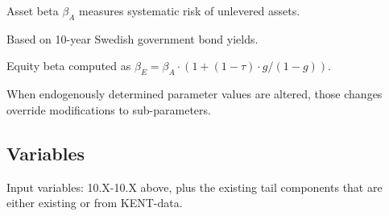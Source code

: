 \begin{table}[H]
\begin{threeparttable}
\begin{tablenotes}
\item[b] Asset beta $\beta_A$ measures systematic risk of unlevered assets.
\item[c] Based on 10-year Swedish government bond yields.
\item[d] Equity beta computed as $\beta_E = \beta_A \cdot (1 + (1-\tau) \cdot g/(1-g))$.
\item When endogenously determined parameter values are altered, those changes override modifications to sub-parameters.
\end{tablenotes}
\end{threeparttable}
\end{table}

\subsection{Variables}

Input variables: 10.X-10.X above, plus the existing tail components that are either existing or from KENT-data.

